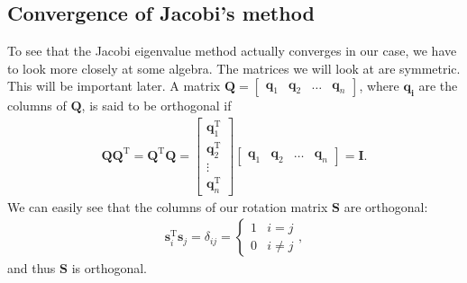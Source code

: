 \documentclass{emulateapj}
\begin{document}
    \subsection{\textbf{Convergence of Jacobi's method}}
        To see that the Jacobi eigenvalue method actually converges in our case, we have to look more closely at some algebra. The matrices we will look at are symmetric. This will be important later. A matrix \(\bm{Q} = \begin{bmatrix} \bm{q}_{1} & \bm{q}_{2} & \ldots & \bm{q}_{n} \end{bmatrix}\),
        where \(\bm{q_{i}}\) are the columns of \(\bm{Q}\), is said to be orthogonal if
        \begin{align*}
            \bm{Q}\bm{Q}^{\text{T}} = \bm{Q}^{\text{T}}\bm{Q} =
            \begin{bmatrix}
                \bm{q}_{1}^{\text{T}} \\
                \bm{q}_{2}^{\text{T}} \\
                \vdots \\
                \bm{q}_{n}^{\text{T}}
            \end{bmatrix}
            \begin{bmatrix}
                \bm{q}_{1} &
                \bm{q}_{2} &
                \ldots &
                \bm{q}_{n}
            \end{bmatrix}
            = 
            \bm{I}.
        \end{align*}
        We can easily see that the columns of our rotation matrix \(\bm{S}\) are orthogonal:
        \begin{align*}
            \bm{s}_{i}^{\text{T}}\bm{s}_{j} = \delta_{ij} = \begin{cases} 1 & i=j \\ 0 & i \neq j \end{cases},
        \end{align*}
        and thus \(\bm{S}\) is orthogonal.
        
\end{document}
